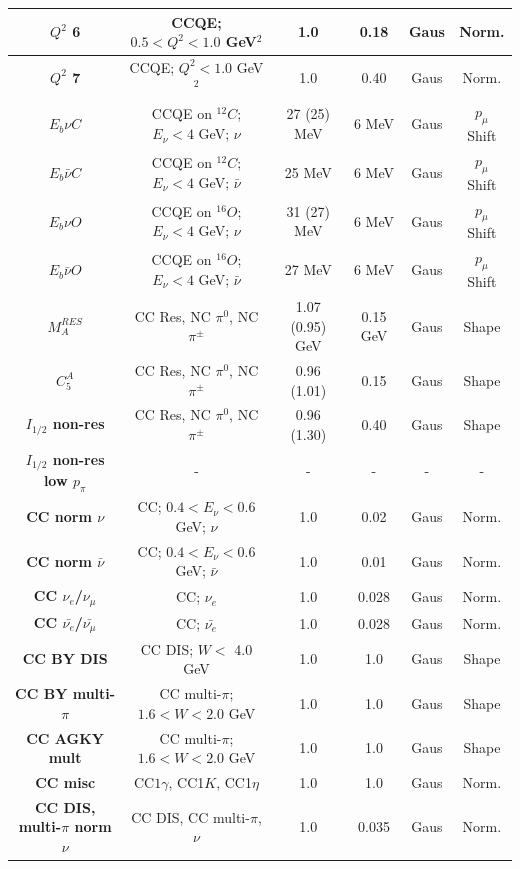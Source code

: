 \begin{center}
\begin{table}
\begin{adjustwidth}{-.9in}{-.9in}
{\begin{tabular}{ c||c|c|c|c|c}
\hline
\textbf{$Q^2$ 6} & CCQE; $0.5<Q^{2}<1.0$ GeV$^{2}$ & 1.0 & 0.18 & Gaus & Norm.\\
\hline
\textbf{$Q^2$ 7} & CCQE; $Q^{2}<1.0$ GeV$^{2}$ & 1.0 & 0.40 & Gaus & Norm.\\
\hline
\textbf{$E_{b} \nu C$} & CCQE on $^{12}C$; $E_{\nu} < 4$ GeV; $\nu$ & 27 (25) MeV & 6 MeV & Gaus & $p_{\mu}$ Shift\\
\hline
\textbf{$E_{b} \bar{\nu} C$} & CCQE on $^{12}C$; $E_{\nu} < 4$ GeV; $\bar{\nu}$ & 25 MeV & 6 MeV & Gaus & $p_{\mu}$ Shift\\
\hline
\textbf{$E_{b} \nu O$} & CCQE on $^{16}O$; $E_{\nu} < 4$ GeV; $\nu$ & 31 (27) MeV & 6 MeV & Gaus & $p_{\mu}$ Shift\\
\hline
\textbf{$E_{b} \bar{\nu} O$} & CCQE on $^{16}O$; $E_{\nu} < 4$ GeV; $\bar{\nu}$ & 27 MeV & 6 MeV & Gaus & $p_{\mu}$ Shift\\
\hline
\textbf{$M^{RES}_{A}$} & CC Res, NC $\pi^{0}$, NC $\pi^{\pm}$ & 1.07 (0.95) GeV & 0.15 GeV & Gaus & Shape\\
\hline
\textbf{$C^{A}_{5}$} & CC Res, NC $\pi^{0}$, NC $\pi^{\pm}$ & 0.96 (1.01) & 0.15 & Gaus & Shape\\
\hline
\textbf{$I_{1/2}$ non-res} & CC Res, NC $\pi^{0}$, NC $\pi^{\pm}$ & 0.96 (1.30) & 0.40 & Gaus & Shape\\
\hline
\textbf{$I_{1/2}$ non-res low $p_{\pi}$} & - & - & - & - & -\\
\hline
\textbf{CC norm $\nu$} & CC; $0.4 <E_{\nu} < 0.6$ GeV; $\nu$ & 1.0 & 0.02 & Gaus & Norm.\\
\hline
\textbf{CC norm $\bar{\nu}$} & CC; $0.4 <E_{\nu} < 0.6$ GeV; $\bar{\nu}$ & 1.0 & 0.01 & Gaus & Norm.\\
\hline
\textbf{CC $\nu_{e}$/$\nu_{\mu}$} & CC; $\nu_{e}$ & 1.0 & 0.028 & Gaus & Norm.\\
\hline
\textbf{CC $\bar{\nu_{e}}$/$\bar{\nu_{\mu}}$} & CC; $\bar{\nu_{e}}$ & 1.0 & 0.028 & Gaus & Norm.\\
\hline
\textbf{CC BY DIS} & CC DIS; $W<$ 4.0 GeV & 1.0 & 1.0 & Gaus & Shape\\
\hline
\textbf{CC BY multi-$\pi$} & CC multi-$\pi$; $1.6<W<2.0$ GeV & 1.0 & 1.0 & Gaus & Shape\\
\hline
\textbf{CC AGKY mult} & CC multi-$\pi$; $1.6<W<2.0$ GeV & 1.0 & 1.0 & Gaus & Shape\\
\hline
\textbf{CC misc} & CC$1\gamma$, CC1$K$, CC1$\eta$ & 1.0 & 1.0 & Gaus & Norm.\\
\hline
\textbf{CC DIS, multi-$\pi$ norm $\nu$} & CC DIS, CC multi-$\pi$, $\nu$ & 1.0 & 0.035 & Gaus & Norm.\\

\end{tabular}}
\end{adjustwidth}
\end{table}
\end{center}
